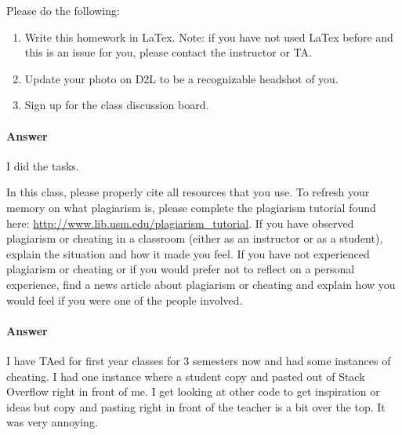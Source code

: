 \documentclass{article}
\begin{document}

\nextprob
{}

Please do the following:
\begin{enumerate}
    \item Write this homework in LaTex.
        Note: if you have not used LaTex before and this is an
        issue for you, please contact the instructor or TA.
    \item Update your photo on D2L to be a recognizable headshot of you.
    \item Sign up for the class discussion board.
\end{enumerate}

\paragraph{Answer}


I did the tasks.



\nextprob
\collab{}

    In this class,
    please properly cite all resources that you use.
    To refresh your memory on what plagiarism is,
    please
    complete the plagiarism tutorial found here:
    \url{http://www.lib.usm.edu/plagiarism_tutorial}.
    If you have observed plagiarism or cheating in a classroom (either as an
    instructor or as a student), explain the situation and how it made you
    feel.  If you have not experienced plagiarism or cheating or if you would
    prefer not to reflect on a personal experience, find a news
    article about plagiarism or cheating and explain how you would feel if you
    were one of the people involved.


\paragraph{Answer}


I have TAed for first year classes for 3 semesters now and had some instances of cheating. I had one instance where a student copy and pasted out of Stack Overflow right in front of me. I get looking at other code to get inspiration or ideas but copy and pasting right in front of the teacher is a bit over the top. It was very annoying. 
\end{document}
